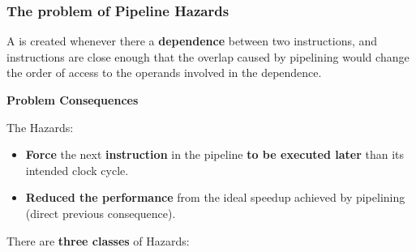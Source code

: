 \subsubsection{The problem of Pipeline Hazards}\label{subsubsection: The problem of Pipeline Hazards}

\begin{definitionbox}
    A  is created whenever there a \textbf{dependence} between two instructions, and instructions are close enough that the overlap caused by pipelining would change the order of access to the operands involved in the dependence.
\end{definitionbox}

\begin{flushleft}
    \textcolor{Red2}{ \textbf{Problem Consequences}}
\end{flushleft}
The Hazards:
\begin{itemize}
    \item \textbf{Force} the next \textbf{instruction} in the pipeline \textbf{to be executed later} than its intended clock cycle.

    \item \textbf{Reduced the performance} from the ideal speedup achieved by pipelining (direct previous consequence).
\end{itemize}
There are \textbf{three classes} of Hazards:
